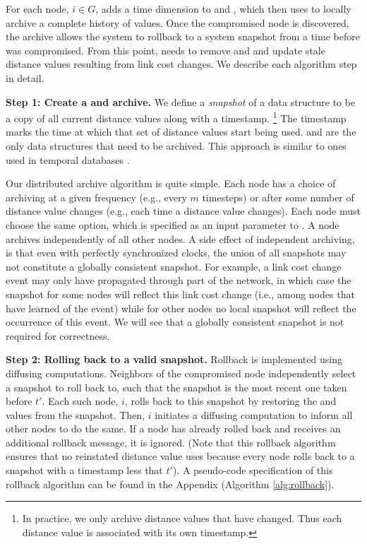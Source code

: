 For each node, $i \in G$, \cpr adds a time dimension to \minvi and \dmatrixis, which \cpr then uses to locally archive a complete history of values. 
Once the compromised node is discovered, 
the archive allows the system to rollback to 
a system snapshot from a time before \bad was compromised. From this point, \cpr needs to remove \bad and \oldvector and update stale distance values resulting from link cost changes.
We describe each algorithm step in detail. %

{\bf Step 1: Create a \minv and \dmatrix archive.} 
	We define a  \emph{snapshot} of a data structure to be a copy of all current distance values along with a timestamp.
	{\footnote {\small In practice, we only archive distance values that have changed. Thus each distance value is associated with its own timestamp.}}
	The timestamp marks the time at which that set of distance values start being used. 
	\minv and \dmatrix are the only data structures that need to be archived. This approach is similar to ones used in temporal databases 
  \cite{Jensen91,Lomet06}.

  Our distributed archive algorithm is quite simple.  %
	Each node has a choice of archiving at a given frequency (e.g., every $m$ timesteps) or after some number of distance value changes (e.g., each time a distance 
	value changes).  Each node must choose the same option, which is specified as an input parameter to \cprs. A node archives independently of all other nodes.
  A side effect of independent archiving, is that even with perfectly synchronized clocks, the union of all snapshots may not constitute a globally consistent snapshot. 
  For example, a link cost change event may only have propagated 
  through part of the network, in which case the snapshot for some nodes will reflect this link cost change (i.e., among nodes that have learned of the event) 
  while for other nodes no local snapshot will reflect the occurrence of this event. We will see that a globally consistent snapshot is not required for correctness.  

{\bf Step 2: Rolling back to a valid snapshot.} 
Rollback is implemented using diffusing computations. Neighbors of the compromised node independently select a snapshot to roll back to, such that the snapshot is the most recent one taken
before $t'$.  Each such node, $i$, rolls back to this snapshot by restoring the \minvi and \dmatrixi values from the snapshot.  Then, $i$ initiates a diffusing computation to inform all other
nodes to do the same. If a node has already rolled back and receives an additional rollback message, it is ignored. 
(Note that this rollback algorithm ensures that no reinstated distance value uses \badvector because every node rolls back to a snapshot 
with a timestamp less that $t'$).  A pseudo-code specification of this rollback algorithm can be found in the Appendix (Algorithm \ref{alg:rollback}).  


